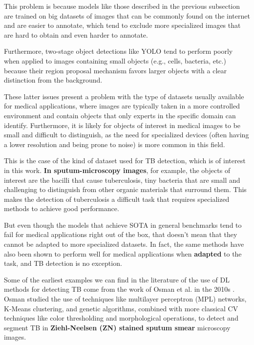 \documentclass[../main.tex]{subfiles}
\begin{document}
    This problem is because models like those described in the previous subsection are trained on big datasets of images that can be commonly found on the internet and are easier to annotate, which tend to exclude more specialized images that are hard to obtain and even harder to annotate.

    Furthermore, two-stage object detections like YOLO tend to perform poorly when applied to images containing small objects (e.g., cells, bacteria, etc.)  because their region proposal mechanism favors larger objects with a clear distinction from the background. 

    These latter issues present a problem with the type of datasets usually available for medical applications, where images are typically taken in a more controlled environment and contain objects that only experts in the specific domain can identify. Furthermore, it is likely for objects of interest in medical images to be small and difficult to distinguish, as the need for specialized devices (often having a lower resolution and being prone to noise) is more common in this field.

    This is the case of the kind of dataset used for TB detection, which is of interest in this work. \textbf{In sputum-microscopy images}, for example, the objects of interest are the bacilli that cause tuberculosis, tiny bacteria that are small and challenging to distinguish from other organic materials that surround them. This makes the detection of tuberculosis a difficult task that requires specialized methods to achieve good performance.

    But even though the models that achieve SOTA in general benchmarks tend to fail for medical applications right out of the box, that doesn't mean that they cannot be adapted to more specialized datasets. In fact, the same methods have also been shown to perform well for medical applications when \textbf{adapted} to the task, and TB detection is no exception.

    Some of the earliest examples we can find in the literature of the use of DL methods for detecting TB come from the work of Osman et al. in the 2010s \cite{osmanDetectionMycobacteriumTuberculosis2010,osman_tuberculosis_2011,ahmadGeneticAlgorithmArtificialNeural2010}. Osman studied the use of techniques like multilayer perceptron (MPL) networks, K-Means clustering, and genetic algorithms, combined with more classical CV techniques like color thresholding and morphological operations, to detect and segment TB in \textbf{Ziehl-Neelsen (ZN) stained sputum smear} microscopy images. 
\end{document}
